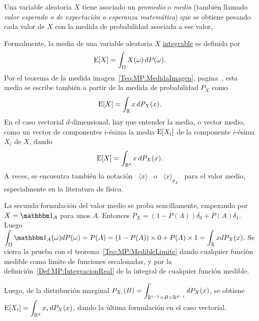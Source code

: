 \label{Sec:MP:esperanzamomento}






\label{Ssec:MP:VectorMedio}


Una  variable aleatoria  $X$  tiene asociado  un  {\it promedio}  o {\it  media}
(tambi\'en  llamado   {\it  valor  esperado  o  de   expectaci\'on  o  esperanza
  matem\'atica})  que se  obtiene pesando  cada valor  de $X$  con la  medida de
probabilidad asociada a ese valor,
%
\begin{definicion}
\label{Def:MP:ValorMedio}
%
  Formalmente, la media de  una variable aleatoria $X$ \underline{integrable} es
  definida por
  \[
  \operatorname{E}[X] = \int_\Omega X(\omega) \, dP(\omega).
  \]
  Por    el    teorema    de    la    medida    imagen~\ref{Teo:MP:MedidaImagen},
  pagina~\pageref{Teo:MP:MedidaImagen}, esta media  se escribe tambi\'en a partir
  de la medida de probabilidad $P_X$ como
  \[
  \operatorname{E}[X] = \int_{\mathbb{R}} x \, dP_X(x).
  \]
  En  el caso vectorial  $d$-dimensional, hay  que entender  la media,  o vector
  medio, como  un vector de componentes  $i$-\'esima la media  $\operatorname{E}[X_i]$ de la
  componente $i$-\'esima $X_i$ de $X$, dando
  \[
  \operatorname{E}[X] = \int_{\mathbb{R}^d} x \, dP_X(x).
  \]
  A veces,  se encuentra  tambi\'en la notaci\'on  \ $\langle  x \rangle$ \  o \
  $\langle  x  \rangle_{p_X}$  \  para  el  valor  medio,  especialmente  en  la
  literatura de f\'isica.
\end{definicion}
%
La secunda formulaci\'on  del valor medio se proba  sencillamente, empezando por
$X = \un_A$ para unos $A$.   Entonces $P_X = (1-P(A)) \delta_0 + P(A) \delta_1$.
Luego  $\displaystyle \int_\Omega  \un_A(\omega)  dP(\omega) =  P(A) =  (1-P(A))
\times 0 +  P(A) \times 1 = \int_\Rset  x dP_X(x)$.  Se cierra la  prueba con el
teorema~\ref{Teo:MP:MedibleLimite} dando cualquier  funci\'on medible como limite
de funciones escalonadas,  y por la definici\'on~\ref{Def:MP:IntegracionReal} de
la integral de cualquier funci\'on medible.

Luego,   de    la   distribuci\'on   marginal    $\displaystyle   P_{X_i}(B)   =
\int_{\mathbb{R}^{i-1}   \times   B   \times   \mathbb{R}^{d-i}}  dP_X(x)$,   se   obtiene
$\displaystyle  \operatorname{E}[X_i] = \int_{\mathbb{R}^d}  x_i \,  dP_X(x)$, dando  la \'ultima
formulaci\'on en el caso vectorial.

